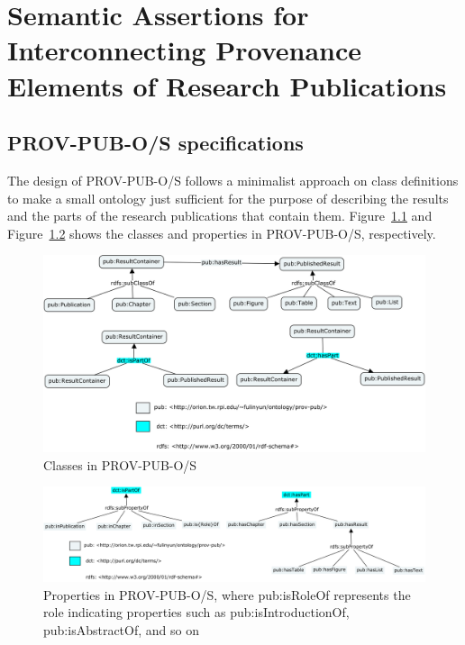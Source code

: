 \chapter{Semantic Assertions for Interconnecting Provenance Elements of Research Publications}
\label{ch:ontologies}
\section{PROV-PUB-O/S specifications}
The design of PROV-PUB-O/S follows a minimalist approach on class definitions to make a small ontology just sufficient for the purpose of describing the results and the parts of the research publications that contain them. Figure~\ref{fig:prov-pub-s-classes} and Figure~\ref{fig:prov-pub-s-properties} shows the classes and properties in PROV-PUB-O/S, respectively.

\begin{figure}
	\centering
	\includegraphics[width=\textwidth]{model/ontology/prov-pub/prov-pub-s-classes.png}
	\caption{Classes in PROV-PUB-O/S}
	\label{fig:prov-pub-s-classes}
\end{figure}

\begin{figure}
	\centering
	\includegraphics[width=\textwidth]{model/ontology/prov-pub/prov-pub-s-properties.png}
	\caption[Properties in PROV-PUB-O/S]{Properties in PROV-PUB-O/S, where pub:is{Role}Of represents the role indicating properties such as pub:isIntroductionOf, pub:isAbstractOf, and so on}
	\label{fig:prov-pub-s-properties}
\end{figure}


